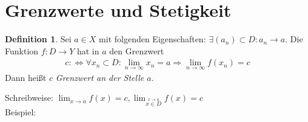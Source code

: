 \documentclass[ngerman,titlepage,twoside, parskip=half*]{scrreprt}
\newcommand*{\perdef}{:\Leftrightarrow}
\theoremstyle{plain}
\theoremstyle{definition}
\newtheorem{definition}{Definition}
\theoremstyle{remark}
\begin{document}
\section{Grenzwerte und Stetigkeit}
\begin{definition}
Sei $a\in X$ mit folgenden Eigenschaften: $\exists (a_n)\subset D\colon a_n\rightarrow a$. Die Funktion $f\colon D\rightarrow Y$
hat in $a$ den Grenzwert 
\begin{gather*}c\perdef \forall x_n \subset D\colon\lim_{n\rightarrow \infty} x_n=a\Rightarrow \lim_{n\rightarrow \infty} f(x_n)=c\end{gather*}
Dann heißt $c$ \emph{Grenzwert an der Stelle $a$}.
\end{definition}
Schreibweise: $\lim_{x\rightarrow a} f(x)=c, 
\lim_{\stackrel{x\rightarrow a}{x \in D}} f(x)=c$\\
Beispiel:
\end{document}
